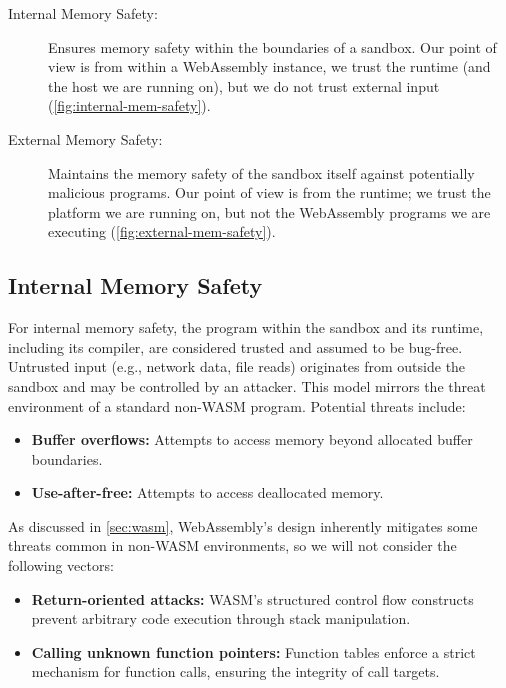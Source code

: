 \begin{description}
    \item[Internal Memory Safety:] Ensures memory safety within the boundaries of a sandbox.
    Our point of view is from within a WebAssembly instance, we trust the runtime (and the host we are running on), but we do not trust external input (\cref{fig:internal-mem-safety}).
    \item[External Memory Safety:] Maintains the memory safety of the sandbox itself against potentially malicious programs.
    Our point of view is from the runtime; we trust the platform we are running on, but not the WebAssembly programs we are executing (\cref{fig:external-mem-safety}).
\end{description}

\subsection{Internal Memory Safety}
\label{subsec:internal-memory-safety}
For internal memory safety, the program within the sandbox and its runtime, including its compiler, are considered trusted and assumed to be bug-free.
Untrusted input (e.g., network data, file reads) originates from outside the sandbox and may be controlled by an attacker.
This model mirrors the threat environment of a standard non-\ac{WASM} program.
Potential threats include:

\begin{itemize}
    \item \textbf{Buffer overflows:} Attempts to access memory beyond allocated buffer boundaries.
    \item \textbf{Use-after-free:} Attempts to access deallocated memory.
\end{itemize}

As discussed in \cref{sec:wasm}, WebAssembly's design inherently mitigates some threats common in non-\ac{WASM} environments, so we will not consider the following vectors:

\begin{itemize}
    \item \textbf{Return-oriented attacks:} {\ac{WASM}'s} structured control flow constructs prevent arbitrary code execution through stack manipulation.
    \item \textbf{Calling unknown function pointers:} Function tables enforce a strict mechanism for function calls, ensuring the integrity of call targets.
\end{itemize}

